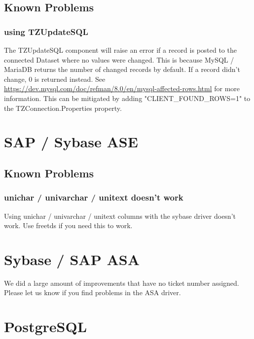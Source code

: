 \documentclass[a4paper,12pt,oneside]{book}
\begin{document}
\subsection{Known Problems}
\label{sec:Rev6_MysqlMariadb_KnownProblems}

\subsubsection{using TZUpdateSQL}
\label{sec:Rev6_MysqlMariadb_KnownProblems_TZUpdateSQL}

The TZUpdateSQL component will raise an error if a record is posted to the connected Dataset where no values were changed.
This is because MySQL / MariaDB returns the number of changed records by default.
If a record didn't change, 0 is returned instead.
See \url{https://dev.mysql.com/doc/refman/8.0/en/mysql-affected-rows.html} for more information.
This can be mitigated by adding "CLIENT\_FOUND\_ROWS=1" to the TZConnection.Properties property.

\section{SAP / Sybase ASE}
\label{sec:Rev6_sybase}

\subsection{Known Problems}
\label{sec:Rev6_sybase_KnownProblems}

\subsubsection{unichar / univarchar / unitext doesn't work}
Using unichar / univarchar / unitext columns with the sybase driver doesn't work. Use freetds if you need this to work.

\section{Sybase / SAP ASA}
\label{sec:Rev6_asa}

We did a large amount of improvements that have no ticket number assigned. Please let us know if you find problems in the ASA driver.

\section{PostgreSQL}
\label{sec:Rev6_postgresql}
\end{document}
